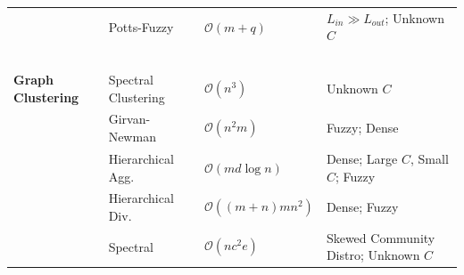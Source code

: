 \begin{landscape}
\begin{table}[t]
{\begin{tabular}{l|lll}
                                                    & Potts-Fuzzy~\cite{Reichardt2004}                  & $\mathcal{O}(m+q)$                        & $L_{in}\gg L_{out}$; Unknown $C$ \\%
                                                    
                                                    
                        ~                           &                         ~                         &        ~                                  & ~ \\
          \textbf{Graph Clustering}                 & Spectral Clustering~\cite{Ng2001}                 & $\mathcal{O}(n^3)$~\cite{White2005}       & Unknown $C$ \\%
                                                    
                                                    & Girvan-Newman~\cite{Girvan2002}                   & $\mathcal{O}(n^2m)$                       & Fuzzy; Dense \\%
                                                    
                                                    & Hierarchical Agg.~\cite{Clauset2004}              & $\mathcal{O}(md\log{n})$                  & Dense; Large $C$, Small $C$; Fuzzy \\%
  
                                                    & Hierarchical Div.~\cite{Newman2004a}              & $\mathcal{O}((m+n)mn^2)$                  & Dense; Fuzzy \\%
                                                                                                        
                                                    & Spectral~\cite{White2005}                         & $\mathcal{O}(nc^{2}e)$                    & Skewed Community Distro; Unknown $C$ \\%
                                                    

\end{tabular}}
\end{table}
\end{landscape}
